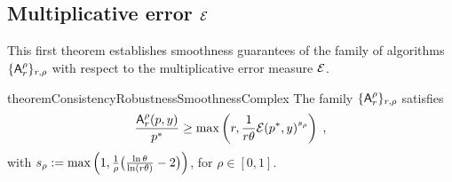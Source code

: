 
\subsection{Multiplicative error \texorpdfstring{$\mathcal{E}$}{}}
This first theorem establishes smoothness guarantees of the family of algorithms $\{\mbox{\textup{\textsf{A}}}^\rho_r\}_{r,\rho}$ with respect to the multiplicative error measure $\mathcal{E}$.

\begin{restatable}{theorem}{ConsistencyRobustnessSmoothnessComplex}\label{thm: [deterministic Pareto-Optimal smooth Algorithm] consistency-robustness-smoothness complex}
The family $\{\mbox{\textup{\textsf{A}}}_{r}^{\rho}\}_{r, \rho}$ satisfies
\begin{equation}\label{eq: [deterministic Pareto-Optimal smooth Algorithm/ THM consistency-robustness-smoothness complex] PR bound}
\frac{\mbox{\textup{\textsf{A}}}_{r}^{\rho}(p, y)}{p^*} \geq 
\max\left(
r, \frac{1}{r \theta} {\mathcal{E}(p^*,y)}^{{s_\rho}}
\right)\;,
\end{equation}
with ${s_\rho} := \max\left(1, \frac{1}{\rho}\big(\tfrac{\ln \theta}{ \ln (r \theta)}-2\big)\right)$, for  $\rho\in[0,1]$.
\end{restatable}


